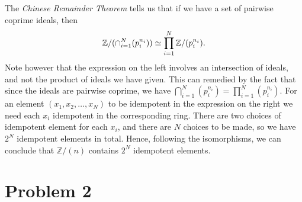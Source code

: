 \documentclass{article}
\newcommand{\Z}{\mathbb{Z}}
\begin{document}
\begin{enumerate}[(i)]
            The \emph{Chinese Remainder Theorem} tells us that if we have a set
            of pairwise coprime ideals, then
            \begin{equation}
                \notag
                \Z / ( \cap_{i = 1}^{N} (p_i^{n_i}) ) \simeq \prod_{i = 1}^{N} \Z / (p_i^{n_i}).
            \end{equation}
            Note however that the expression on the left involves an
            intersection of ideals, and not the product of ideals we have
            given. This can remedied by the fact that since the ideals are
            pairwise coprime, we have $\bigcap_{i=1}^N (p_i^{n_i}) =
            \prod_{i=1}^N (p_i^{n_i})$. For an element $(x_1, x_2, \ldots,
            x_N)$ to be idempotent in the expression on the right we need each
            $x_i$ idempotent in the corresponding ring. There are two choices
            of idempotent element for each $x_i$, and there are $N$ choices to
            be made, so we have $2^N$ idempotent elements in total. Hence,
            following the isomorphisms, we can conclude that $\Z / (n)$
            contains $2^N$ idempotent elements.
\end{enumerate} 

    \section*{Problem 2}
    \label{sec:problem_2}
        
\end{document}
